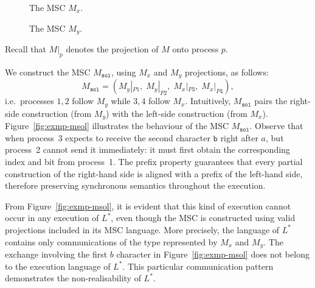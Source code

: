 \begin{example}
\begin{figure}[!ht]
\begin{msc}[draw frame=none, draw head=none, msc keyword=, head height=0px, label distance=0.5ex, foot height=0px, foot distance=0px]{}

\end{msc}
\caption{The MSC $M_x$.}
\label{fig:exmp-mx}
\end{figure}

\begin{figure}[!ht]
\centering
\begin{msc}[draw frame=none, draw head=none, msc keyword=, head height=0px, label distance=0.5ex, foot height=0px, foot distance=0px]{}



\end{msc}
\caption{The MSC $M_y$.}
\label{fig:exmp-my}
\end{figure}

Recall that $M|_p$ denotes the projection of $M$ onto process $p$. 

We construct the MSC $M_{\texttt{sol}}$, using $M_x$ and $M_y$ projections, as follows:
$$
  M_{\texttt{sol}} = (M_y|_{P1},\; M_y|_{P2},\; M_x|_{P3},\; M_x|_{P4}),
$$
i.e.\ processes $1,2$ follow $M_y$ while $3,4$ follow $M_x$.
Intuitively, $M_{\texttt{sol}}$ pairs the right-side construction (from $M_y$)
with the left-side construction (from $M_x$). 
Figure~\ref{fig:exmp-msol} illustrates the behaviour of the MSC
$M_{\texttt{sol}}$. Observe that when process~3 expects to receive the
second character $\texttt{b}$ right after $a$, 
but process~2 cannot send it immediately:
it must first obtain the corresponding index and bit from process~1.
The prefix property guarantees
that every partial construction of the right-hand side is aligned with
a prefix of the left-hand side, therefore preserving synchronous
semantics throughout the execution.

From Figure~\ref{fig:exmp-msol}, it is evident that this kind of execution 
cannot occur in any execution of $L^*$, even though the MSC is constructed 
using valid projections included in its MSC language. 
More precisely, the language of $L^*$ contains only communications 
of the type represented by $M_x$ and $M_y$. 
The exchange involving the first $b$ character in Figure~\ref{fig:exmp-msol} 
does not belong to the execution language of $L^*$. 
This particular communication pattern demonstrates 
the non-realisability of $L^*$.



\end{example}
